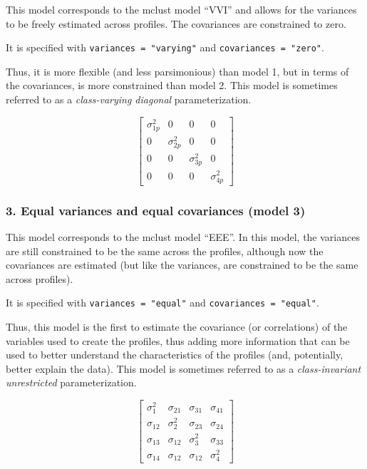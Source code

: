 \documentclass[man]{apa6}
\begin{document}
This model corresponds to the mclust model \enquote{VVI} and allows for the variances to be freely estimated across profiles. The covariances are constrained to zero.

It is specified with \texttt{variances\ =\ "varying"} and \texttt{covariances\ =\ "zero"}.

Thus, it is more flexible (and less parsimonious) than model 1, but in terms of the covariances, is more constrained than model 2. This model is sometimes referred to as a \emph{class-varying diagonal} parameterization.

\[ 
\left[ \begin{matrix} { \sigma  }_{ 1p }^{ 2 } & 0 & 0 & 0 \\ 0 & { \sigma  }_{ 2p }^{ 2 } & 0 & 0 \\ 0 & 0 & { \sigma  }_{ 3p }^{ 2 } & 0 \\ 0 & 0 & 0 & { \sigma  }_{ 4p }^{ 2 } \end{matrix} \right] 
\]

\hypertarget{equal-variances-and-equal-covariances-model-3}{%
\subsubsection{3. Equal variances and equal covariances (model 3)}\label{equal-variances-and-equal-covariances-model-3}}

This model corresponds to the mclust model \enquote{EEE}. In this model, the variances are still constrained to be the same across the profiles, although now the covariances are estimated (but like the variances, are constrained to be the same across profiles).

It is specified with \texttt{variances\ =\ "equal"} and \texttt{covariances\ =\ "equal"}.

Thus, this model is the first to estimate the covariance (or correlations) of the variables used to create the profiles, thus adding more information that can be used to better understand the characteristics of the profiles (and, potentially, better explain the data). This model is sometimes referred to as a \emph{class-invariant unrestricted} parameterization.

\[
\left[ \begin{matrix} { \sigma  }_{ 1 }^{ 2 } & { \sigma  }_{ 21 } & { \sigma  }_{ 31 } & { \sigma  }_{ 41 } \\ { \sigma  }_{ 12 } & { \sigma  }_{ 2 }^{ 2 } & { \sigma  }_{ 23 } & { \sigma  }_{ 24 } \\ { \sigma  }_{ 13 } & { \sigma  }_{ 12 } & { \sigma  }_{ 3 }^{ 2 } & { \sigma  }_{ 33 } \\ { \sigma  }_{ 14 } & { \sigma  }_{ 12 } & { \sigma  }_{ 12 } & { \sigma  }_{ 4 }^{ 2 } \end{matrix} \right] 
\]
\end{document}

